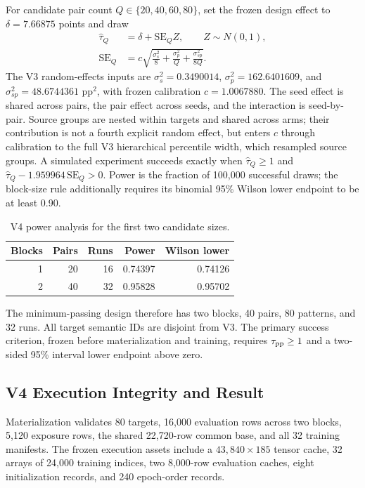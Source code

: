 For candidate pair count \(Q\in\{20,40,60,80\}\), set the frozen design
effect to \(\delta=7.66875\) points and draw
\[
\begin{aligned}
\widehat\tau_Q&=\delta+\mathrm{SE}_Q Z,\qquad Z\sim N(0,1),\\
\mathrm{SE}_Q
&=c\sqrt{
\frac{\sigma_s^2}{8}
+\frac{\sigma_p^2}{Q}
+\frac{\sigma_{sp}^2}{8Q}
}.
\end{aligned}
\]
The V3 random-effects inputs are
\(\sigma_s^2=0.3490014\),
\(\sigma_p^2=162.6401609\), and
\(\sigma_{sp}^2=48.6744361\) pp\(^2\), with frozen calibration
\(c=1.0067880\).  The seed effect is shared across pairs, the pair effect
across seeds, and the interaction is seed-by-pair.  Source groups are nested
within targets and shared across arms; their contribution is not a fourth
explicit random effect, but enters \(c\) through calibration to the full V3
hierarchical percentile width, which resampled source groups.  A simulated
experiment succeeds exactly when
\(\widehat\tau_Q\geq1\) and
\(\widehat\tau_Q-1.959964\,\mathrm{SE}_Q>0\).
Power is the fraction of 100,000 successful draws; the block-size rule additionally
requires its binomial 95\% Wilson lower endpoint to be at least 0.90.

\begin{table}[H]
\caption{V4 power analysis for the first two candidate sizes.}
\label{tab:app-clutrr-power}
\centering
\small
\begin{tabular}{rrrrr}
\toprule
Blocks & Pairs & Runs & Power & Wilson lower \\
\midrule
1 & 20 & 16 & 0.74397 & 0.74126 \\
2 & 40 & 32 & 0.95828 & 0.95702 \\
\bottomrule
\end{tabular}
\end{table}

The minimum-passing design therefore has two blocks, 40 pairs, 80 patterns,
and 32 runs.  All target semantic IDs are disjoint from V3.  The primary success criterion,
frozen before materialization and training, requires
\(\tau_{\rm pp}\geq1\) and a two-sided 95\% interval lower endpoint above
zero.

\subsection{V4 Execution Integrity and Result}

Materialization validates 80 targets, 16,000 evaluation rows across two
blocks, 5,120 exposure rows, the shared 22,720-row common base, and all 32
training manifests.  The frozen execution assets include a
$43{,}840\times185$ tensor cache, 32 arrays of 24,000 training indices,
two 8,000-row evaluation caches, eight initialization records, and 240
epoch-order records.

